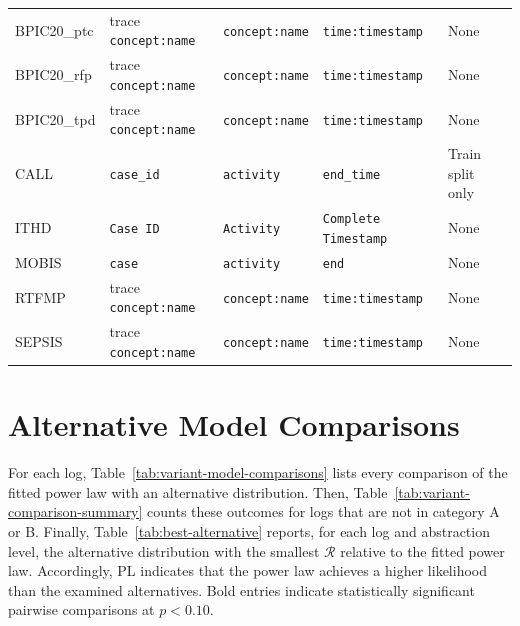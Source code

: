 \documentclass[11pt,a4paper]{article}
\begin{document}
\begin{table}[H]
{\begin{tabular}{@{}lllll@{}}
BPIC20\_ptc & trace \texttt{concept:name} & \texttt{concept:name} & \texttt{time:timestamp} & None \\
BPIC20\_rfp & trace \texttt{concept:name} & \texttt{concept:name} & \texttt{time:timestamp} & None \\
BPIC20\_tpd & trace \texttt{concept:name} & \texttt{concept:name} & \texttt{time:timestamp} & None \\
CALL & \texttt{case\_id} & \texttt{activity} & \texttt{end\_time} & Train split only \\
ITHD & \texttt{Case ID} & \texttt{Activity} & \texttt{Complete Timestamp} & None \\
MOBIS & \texttt{case} & \texttt{activity} & \texttt{end} & None \\
RTFMP & trace \texttt{concept:name} & \texttt{concept:name} & \texttt{time:timestamp} & None \\
SEPSIS & trace \texttt{concept:name} & \texttt{concept:name} & \texttt{time:timestamp} & None \\
\bottomrule
\end{tabular}%
}
\end{table}
\FloatBarrier

\section{Alternative Model Comparisons}
\label{sec:alternatives}

For each log, Table~\ref{tab:variant-model-comparisons} lists every comparison of the fitted power law with an alternative distribution. Then, Table~\ref{tab:variant-comparison-summary} counts these outcomes for logs that are not in category A or B. Finally, Table~\ref{tab:best-alternative} reports, for each log and abstraction level, the alternative distribution with the smallest $\mathcal{R}$ relative to the fitted power law.
Accordingly, PL indicates that the power law achieves a higher likelihood than the examined alternatives.
Bold entries indicate statistically significant pairwise comparisons at $p<0.10$.

\AppendixVariantComparisonInput

\AppendixVariantComparisonSummaryInput


\begin{landscape}
\begin{table}[p]
\centering
\caption{Best-fitting distribution relative to the power law across
abstraction orders ($k=1,\ldots,20$) and trace variants (TV).
Bold entries indicate a significant likelihood-ratio comparison
($p<0.10$).}
\label{tab:best-alternative}
\begingroup
\setlength{\tabcolsep}{2pt}%
\tiny
\AppendixBestAlternativeInput
\endgroup
\end{table}
\end{landscape}
\end{document}
